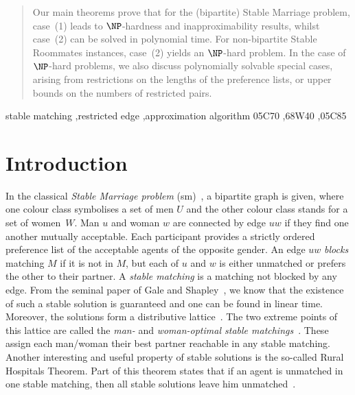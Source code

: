 \documentclass[preprint,12pt]{elsarticle}
\begin{document}
\begin{frontmatter}
\begin{abstract}
Our main theorems prove that for the (bipartite) Stable Marriage problem, case~(1) leads to $\NP$-hardness and inapproximability results, whilst case~(2) can be solved in polynomial time.  For non-bipartite Stable Roommates instances, case~(2) yields an $\NP$-hard problem.  In the case of $\NP$-hard problems, we also discuss polynomially solvable special cases, arising from restrictions on the lengths of the preference lists, or upper bounds on the numbers of restricted pairs.
\end{abstract}

\begin{keyword}
stable matching \sep restricted edge \sep approximation algorithm 
 \MSC 05C70 \sep 68W40 \sep 05C85
\end{keyword}
\end{frontmatter}

\section{Introduction}
\label{se:intro}

In the classical \emph{Stable Marriage problem} ({\sc sm})~\cite{GS62}, a bipartite graph is given, where one colour class symbolises a set of men $U$ and the other colour class stands for a set of women~$W$. Man $u$ and woman $w$ are connected by edge $uw$ if they find one another mutually acceptable. Each participant provides a strictly ordered preference list of the acceptable agents of the opposite gender. An edge $uw$ \emph{blocks} matching $M$ if it is not in $M$, but each of $u$ and $w$ is either unmatched or prefers the other to their partner. A \emph{stable matching} is a matching not blocked by any edge. From the seminal paper of Gale and Shapley~\cite{GS62}, we know that the existence of such a stable solution is guaranteed and one can be found in linear time. Moreover, the solutions form a distributive lattice~\cite{Knu76}. The two extreme points of this lattice are called the \emph{man-} and \emph{woman-optimal stable matchings}~\cite{GS62}. These assign each man/woman their best partner reachable in any stable matching. Another interesting and useful property of stable solutions is the so-called Rural Hospitals Theorem. Part of this theorem states that if an agent is unmatched in one stable matching, then all stable solutions leave him unmatched~\cite{GS85}.
\end{document}
